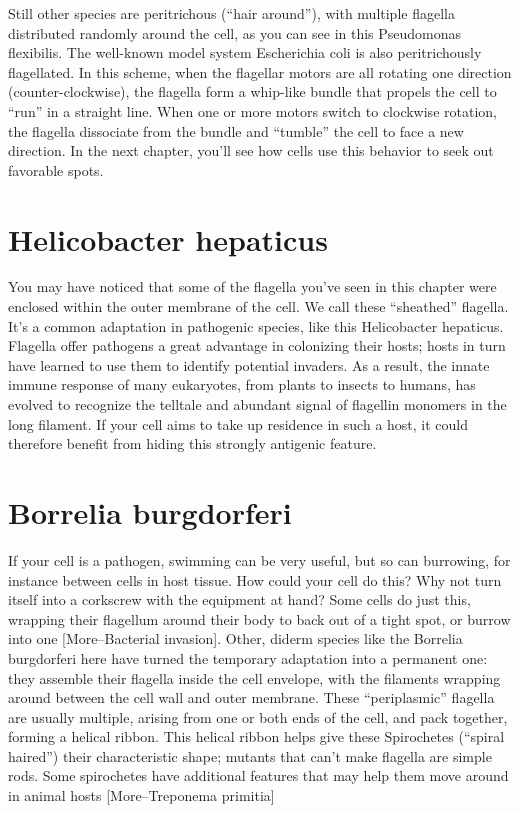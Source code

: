 \documentclass[]{tufte-book}
\begin{document}
Still other species are peritrichous (``hair around''), with multiple
flagella distributed randomly around the cell, as you can see in this
Pseudomonas flexibilis. The well-known model system Escherichia coli is
also peritrichously flagellated. In this scheme, when the flagellar
motors are all rotating one direction (counter-clockwise), the flagella
form a whip-like bundle that propels the cell to ``run'' in a straight
line. When one or more motors switch to clockwise rotation, the flagella
dissociate from the bundle and ``tumble'' the cell to face a new
direction. In the next chapter, you'll see how cells use this behavior
to seek out favorable spots.

\section{Helicobacter hepaticus}\label{helicobacter-hepaticus}

You may have noticed that some of the flagella you've seen in this
chapter were enclosed within the outer membrane of the cell. We call
these ``sheathed'' flagella. It's a common adaptation in pathogenic
species, like this Helicobacter hepaticus. Flagella offer pathogens a
great advantage in colonizing their hosts; hosts in turn have learned to
use them to identify potential invaders. As a result, the innate immune
response of many eukaryotes, from plants to insects to humans, has
evolved to recognize the telltale and abundant signal of flagellin
monomers in the long filament. If your cell aims to take up residence in
such a host, it could therefore benefit from hiding this strongly
antigenic feature.

\section{Borrelia burgdorferi}\label{borrelia-burgdorferi-1}

If your cell is a pathogen, swimming can be very useful, but so can
burrowing, for instance between cells in host tissue. How could your
cell do this? Why not turn itself into a corkscrew with the equipment at
hand? Some cells do just this, wrapping their flagellum around their
body to back out of a tight spot, or burrow into one {[}More--Bacterial
invasion{]}. Other, diderm species like the Borrelia burgdorferi here
have turned the temporary adaptation into a permanent one: they assemble
their flagella inside the cell envelope, with the filaments wrapping
around between the cell wall and outer membrane. These ``periplasmic''
flagella are usually multiple, arising from one or both ends of the
cell, and pack together, forming a helical ribbon. This helical ribbon
helps give these Spirochetes (``spiral haired'') their characteristic
shape; mutants that can't make flagella are simple rods. Some
spirochetes have additional features that may help them move around in
animal hosts {[}More--Treponema primitia{]}
\end{document}
